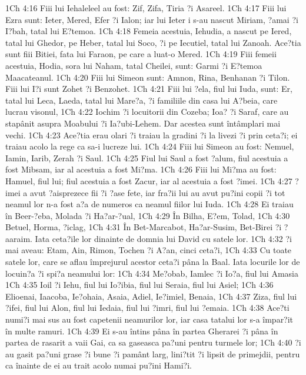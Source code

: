 1Ch 4:16  Fiii lui Iehaleleel au fost: Zif, Zifa, Tiria ?i Asareel.
1Ch 4:17  Fiii lui Ezra sunt: Ieter, Mered, Efer ?i Ialon; iar lui Ieter i s-au nascut Miriam, ?amai ?i I?bah, tatal lui E?temoa.
1Ch 4:18  Femeia acestuia, Iehudia, a nascut pe Iered, tatal lui Ghedor, pe Heber, tatal lui Soco, ?i pe Iecutiel, tatal lui Zanoah. Ace?tia sunt fiii Bitiei, fata lui Faraon, pe care a luat-o Mered.
1Ch 4:19  Fiii femeii acestuia, Hodia, sora lui Naham, tatal Cheilei, sunt: Garmi ?i E?temoa Maacateanul.
1Ch 4:20  Fiii lui Simeon sunt: Amnon, Rina, Benhanan ?i Tilon. Fiii lui I?i sunt Zohet ?i Benzohet.
1Ch 4:21  Fiii lui ?ela, fiul lui Iuda, sunt: Er, tatal lui Leca, Laeda, tatal lui Mare?a, ?i familiile din casa lui A?beia, care lucrau visonul,
1Ch 4:22  Iochim ?i locuitorii din Cozeba; Ioa? ?i Saraf, care au stapânit asupra Moabului ?i Ia?ubi-Lehem. Dar acestea sunt întâmplari mai vechi.
1Ch 4:23  Ace?tia erau olari ?i traiau la gradini ?i la livezi ?i prin ceta?i; ei traiau acolo la rege ca sa-i lucreze lui.
1Ch 4:24  Fiii lui Simeon au fost: Nemuel, Iamin, Iarib, Zerah ?i Saul.
1Ch 4:25  Fiul lui Saul a fost ?alum, fiul acestuia a fost Mibsam, iar al acestuia a fost Mi?ma.
1Ch 4:26  Fiii lui Mi?ma au fost: Hamuel, fiul lui; fiul acestuia a fost Zacur, iar al acestuia a fost ?imei.
1Ch 4:27  ?imei a avut ?aisprezece fii ?i ?ase fete, iar fra?ii lui au avut pu?ini copii ?i tot neamul lor n-a fost a?a de numeros ca neamul fiilor lui Iuda.
1Ch 4:28  Ei traiau în Beer-?eba, Molada ?i Ha?ar-?ual,
1Ch 4:29  În Bilha, E?em, Tolad,
1Ch 4:30  Betuel, Horma, ?iclag,
1Ch 4:31  În Bet-Marcabot, Ha?ar-Susim, Bet-Birei ?i ?aaraim. Iata ceta?ile lor dinainte de domnia lui David cu satele lor.
1Ch 4:32  ?i mai aveau: Etam, Ain, Rimon, Tochen ?i A?an, cinci ceta?i,
1Ch 4:33  Cu toate satele lor, care se aflau împrejurul acestor ceta?i pâna la Baal. Iata locurile lor de locuin?a ?i spi?a neamului lor:
1Ch 4:34  Me?obab, Iamlec ?i Io?a, fiul lui Amasia
1Ch 4:35  Ioil ?i Iehu, fiul lui Io?ibia, fiul lui Seraia, fiul lui Asiel;
1Ch 4:36  Elioenai, Iaacoba, Ie?ohaia, Asaia, Adiel, Ie?imiel, Benaia,
1Ch 4:37  Ziza, fiul lui ?ifei, fiul lui Alon, fiul lui Iedaia, fiul lui ?imri, fiul lui ?emaia.
1Ch 4:38  Ace?ti numi?i mai sus au fost capetenii neamurilor lor, iar casa tatalui lor s-a împar?it în multe ramuri.
1Ch 4:39  Ei s-au întins pâna în partea Gherarei ?i pâna în partea de rasarit a vaii Gai, ca sa gaseasca pa?uni pentru turmele lor;
1Ch 4:40  ?i au gasit pa?uni grase ?i bune ?i pamânt larg, lini?tit ?i lipsit de primejdii, pentru ca înainte de ei au trait acolo numai pu?ini Hami?i.

